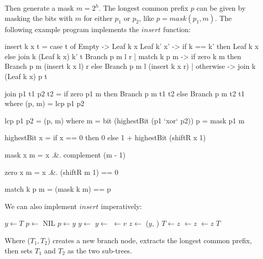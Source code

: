 \documentclass[b5paper]{article}
\begin{document}
Then generate a mask $m = 2^h$. The longest common prefix $p$ can be given by masking the bits with $m$ for either $p_1$ or $p_2$, like $p = mask(p_1, m)$. The following example program implements the $insert$ function:

\begin{Haskell}
insert k x t
   = case t of
       Empty -> Leaf k x
       Leaf k' x' -> if k == k' then Leaf k x
                     else join k (Leaf k x) k' t
       Branch p m l r
          | match k p m -> if zero k m
                           then Branch p m (insert k x l) r
                           else Branch p m l (insert k x r)
          | otherwise -> join k (Leaf k x) p t

join p1 t1 p2 t2 = if zero p1 m then Branch p m t1 t2
                                else Branch p m t2 t1
    where
      (p, m) = lcp p1 p2

lcp p1 p2 = (p, m) where
    m = bit (highestBit (p1 `xor` p2))
    p = mask p1 m

highestBit x = if x == 0 then 0 else 1 + highestBit (shiftR x 1)

mask x m = x .&. complement (m - 1)

zero x m = x .&. (shiftR m 1) == 0

match k p m = (mask k m) == p
\end{Haskell}

We can also implement $insert$ imperatively:

\begin{algorithmic}[1]
    \State \Return {}
  \EndIf
  \State $y \gets T$
  \State $p \gets$ NIL
    \State $p \gets y$
      \State $y \gets$ 
    \Else
      \State $y \gets$ 
    \EndIf
  \EndWhile
    \State {} $\gets v$
  \Else
    \State $z \gets$ ($y$, )
      \State $T \gets z$
    \Else
        \State {} $\gets z$
      \Else
        \State {} $\gets z$
      \EndIf
    \EndIf
  \EndIf
  \State \Return $T$
\EndFunction
\end{algorithmic}

Where ($T_1, T_2$) creates a new branch node, extracts the longest common prefix, then sets $T_1$ and $T_2$ as the two sub-trees.
\end{document}
